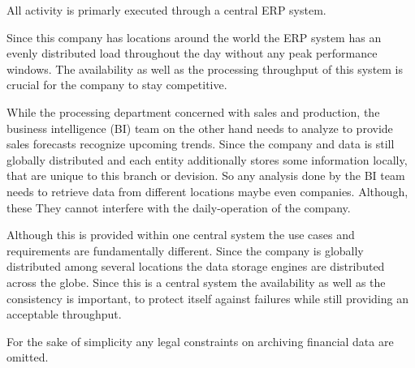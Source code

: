 
All activity is primarly executed through a central ERP system. 

Since this company has locations around the world the ERP system has an evenly distributed load throughout the day without any peak performance windows.
The availability as well as the processing throughput of this system is crucial for the company to stay competitive.

While the processing department concerned with sales and production, the business intelligence (BI) team on the other hand needs to analyze to provide sales forecasts recognize 
upcoming trends. Since the company and data is still globally distributed and each entity additionally stores some information locally, that are unique to this branch or devision. 
So any analysis done by the BI team needs to retrieve data from different locations maybe even companies. Although, these
They cannot interfere with the daily-operation of the company. 

Although this is provided within one central system the use cases and requirements are fundamentally different.
Since the company is globally distributed among several locations the data storage engines are distributed across the globe.
Since this is a central system the availability as well as the consistency is important, to protect itself against failures while still providing an acceptable throughput.


For the sake of simplicity any legal constraints on archiving financial data are omitted. 